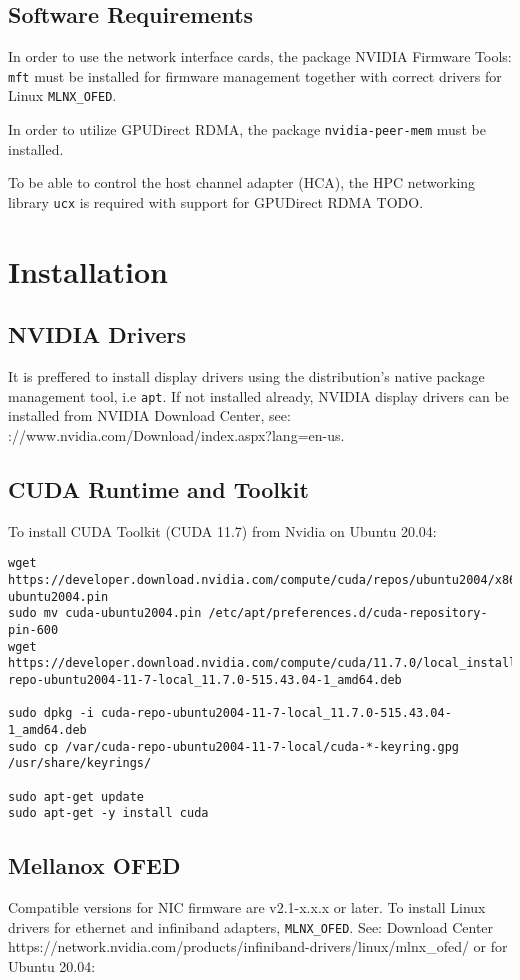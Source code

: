 \documentclass[a4paper,onecolumn]{article}
\begin{document}
\subsection{Software Requirements}
In order to use the network interface cards, the package NVIDIA Firmware Tools: \verb|mft| must be installed for firmware management together with correct drivers for Linux \verb|MLNX_OFED|. 

In order to utilize GPUDirect RDMA, the package \verb|nvidia-peer-mem| must be installed.

To be able to control the host channel adapter (HCA), the HPC networking library \verb|ucx| is required with support for GPUDirect RDMA TODO.

\section{Installation}

\subsection{NVIDIA Drivers}
It is preffered to install display drivers using the distribution's native package management tool, i.e \verb|apt|. If not installed already, NVIDIA display drivers can be installed from NVIDIA Download Center, see: \urlhttps://www.nvidia.com/Download/index.aspx?lang=en-us.

\subsection{CUDA Runtime and Toolkit}
To install CUDA Toolkit (CUDA 11.7) from Nvidia on Ubuntu 20.04:

\begin{Verbatim}[commandchars=\\\{\}]
wget https://developer.download.nvidia.com/compute/cuda/repos/ubuntu2004/x86_64/cuda-ubuntu2004.pin
sudo mv cuda-ubuntu2004.pin /etc/apt/preferences.d/cuda-repository-pin-600
wget https://developer.download.nvidia.com/compute/cuda/11.7.0/local_installers/cuda-repo-ubuntu2004-11-7-local_11.7.0-515.43.04-1_amd64.deb

sudo dpkg -i cuda-repo-ubuntu2004-11-7-local_11.7.0-515.43.04-1_amd64.deb
sudo cp /var/cuda-repo-ubuntu2004-11-7-local/cuda-*-keyring.gpg /usr/share/keyrings/

sudo apt-get update
sudo apt-get -y install cuda
\end{Verbatim}

\subsection{Mellanox OFED}
Compatible versions for NIC firmware are v2.1-x.x.x or later. To install Linux drivers for ethernet and infiniband adapters, \verb|MLNX_OFED|. See: Download Center https://network.nvidia.com/products/infiniband-drivers/linux/mlnx_ofed/ or for Ubuntu 20.04:
\end{document}
